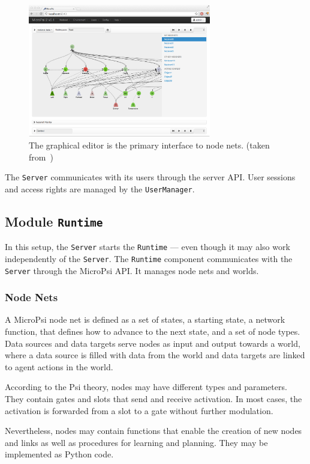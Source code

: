 \begin{figure}[h]
  \centering
    \includegraphics[width=8cm]{graphics/micropsi2_nodenet}
  \caption{The graphical editor is the primary interface to node nets. (taken from~\cite{conf/agi/Bach12})}
  \label{micropsi2_nodenet}
\end{figure}

The \texttt{Server} communicates with its users through the server API. User sessions and access rights are managed by the \texttt{UserManager}.
   
        \subsection{Module \texttt{Runtime}}
In this setup, the \texttt{Server} starts the \texttt{Runtime} --- even though it may also work independently of the \texttt{Server}. The \texttt{Runtime} component communicates with the \texttt{Server} through the MicroPsi API. It manages node nets and worlds.

        \subsubsection{Node Nets}
A MicroPsi node net is defined as a set of states, a starting state, a network function, that defines how to advance to the next state, and a set of node types. Data sources and data targets serve nodes as input and output towards a world, where a data source is filled with data from the world and data targets are linked to agent actions in the world.

According to the Psi theory, nodes may have different types and parameters. They contain gates and slots that send and receive activation. In most cases, the activation is forwarded from a slot to a gate without further modulation.

Nevertheless, nodes may contain functions that enable the creation of new nodes and links as well as procedures for learning and planning. They may be implemented as Python code.


